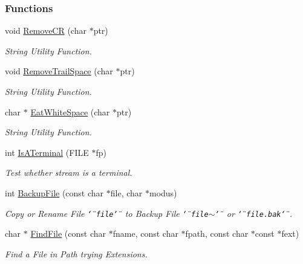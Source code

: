 \subsubsection*{Functions}
\begin{CompactItemize}
\item 
void \hyperlink{group__utilities_g869ea1081375ada22168696db002bc58}{RemoveCR} (char $\ast$ptr)
\begin{CompactList}\small\item\em String Utility Function. \item\end{CompactList}\item 
void \hyperlink{group__utilities_gbb7b78ca5a077167e24637bba539eea1}{RemoveTrailSpace} (char $\ast$ptr)
\begin{CompactList}\small\item\em String Utility Function. \item\end{CompactList}\item 
char $\ast$ \hyperlink{group__utilities_gb6760d18c7c13f3c80d365abcb6a46b3}{EatWhiteSpace} (char $\ast$ptr)
\begin{CompactList}\small\item\em String Utility Function. \item\end{CompactList}\item 
int \hyperlink{group__utilities_g9a90e738d03b642f33901600671d225a}{IsATerminal} (FILE $\ast$fp)
\begin{CompactList}\small\item\em Test whether stream is a terminal. \item\end{CompactList}\item 
int \hyperlink{group__utilities_g0fccda7427db33b2f73a3b6dca864207}{BackupFile} (const char $\ast$file, char $\ast$modus)
\begin{CompactList}\small\item\em Copy or Rename File {\tt \char`\"{}file\char`\"{}} to Backup File {\tt \char`\"{}file$\sim$\char`\"{}} or {\tt \char`\"{}file.bak\char`\"{}}. \item\end{CompactList}\item 
char $\ast$ \hyperlink{group__utilities_g4e4e8f9a03b7f3598b5efd199b9a67c9}{FindFile} (const char $\ast$fname, const char $\ast$fpath, const char $\ast$const $\ast$fext)
\begin{CompactList}\small\item\em Find a File in Path trying Extensions. \item\end{CompactList}\end{CompactItemize}


